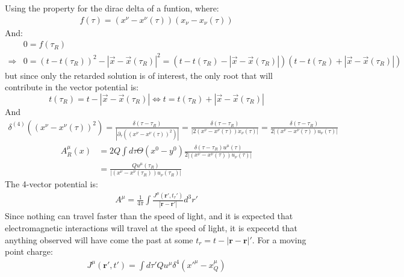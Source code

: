 \documentclass[12pt,a4]{article}
\begin{document}
\begin{enumerate}
\begin{enumerate}
        Using the property for the dirac delta of a funtion, where:
        \begin{align*}
          f(\tau) = (x^\nu - x^{\nu}(\tau))(x_\nu - x_{\nu}(\tau)) 
        \end{align*}
        And:
        \begin{align*}
          &0 = f(\tau_R)\\ 
          \Rightarrow &0 = (t - t(\tau_R))^2 - |\vec{x} - \vec{x}(\tau_R)|^2 = (t - t(\tau_R) - |\vec{x} - \vec{x}(\tau_R)|) (t - t(\tau_R) + |\vec{x} - \vec{x}(\tau_R)|)
        \end{align*}
        but since only the retarded solution is of interest, the only root that will contribute in the vector potential is:
        \begin{equation*}
          t(\tau_R) = t  - |\vec{x} - \vec{x}(\tau_R)| \Leftrightarrow t = t(\tau_R) + |\vec{x} - \vec{x}(\tau_R)|
        \end{equation*}
        And
        \begin{align*}
          \delta^{(4)}\left((x^\nu - x^{\nu}(\tau))^2\right) = \frac{\delta(\tau - \tau_R)}{\left|\partial_\tau\left((x^\nu - x^{\nu}(\tau))^2\right)\right|} = \frac{\delta(\tau - \tau_R)}{\left|2(x^\nu - x^{\nu}(\tau))\dot{x}_{\nu}(\tau)\right|} = \frac{\delta(\tau - \tau_R)}{2\left|(x^\nu - x^{\nu}(\tau))u_{\nu}(\tau)\right|}
        \end{align*}
        \begin{align*}
          A^\mu_R(x) &= 2 Q \int d\tau \Theta(x^{0} - y^{0})\frac{\delta(\tau - \tau_R) u^\mu(\tau)}{2\left|(x^\nu - x^{\nu}(\tau))u_{\nu}(\tau)\right|} \\
                     &= \frac{Qu^\mu(\tau_R)}{\left|(x^\nu - x^{\nu}(\tau_R))u_{\nu}(\tau_R)\right|} 
        \end{align*}
        The 4-vector potential is:
        \begin{gather*}
          A^\mu = \frac{1}{4 \pi}\int \frac{J^\mu (\mathbf{r}', t_r')}{|\mathbf{r} - \mathbf{r}'|} d^3r'
        \end{gather*}
        Since nothing can travel faster than the speed of light, and it is expected that electromagnetic interactions will travel at the speed of light, it is expecetd that anything observed will have come the past at some $t_r = t - |\mathbf{r} - \mathbf{r}|'$.
        For a moving point charge:
        \begin{gather*}
          J^\mu (\mathbf{r}', t') = \int d\tau' Q u^\mu \delta^4(x'^\mu - x_Q^\mu)

\end{gather*}
\end{enumerate}
\end{enumerate}
\end{document}
